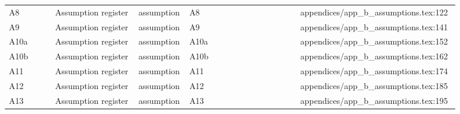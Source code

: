 \begin{longtable}{p{0.10\linewidth}p{0.18\linewidth}p{0.10\linewidth}p{0.24\linewidth}p{0.26\linewidth}}
A8 & Assumption register & assumption & A8 & appendices/app\_b\_assumptions.tex:122 \\
A9 & Assumption register & assumption & A9 & appendices/app\_b\_assumptions.tex:141 \\
A10a & Assumption register & assumption & A10a & appendices/app\_b\_assumptions.tex:152 \\
A10b & Assumption register & assumption & A10b & appendices/app\_b\_assumptions.tex:162 \\
A11 & Assumption register & assumption & A11 & appendices/app\_b\_assumptions.tex:174 \\
A12 & Assumption register & assumption & A12 & appendices/app\_b\_assumptions.tex:185 \\
A13 & Assumption register & assumption & A13 & appendices/app\_b\_assumptions.tex:195 \\
\bottomrule
\end{longtable}
